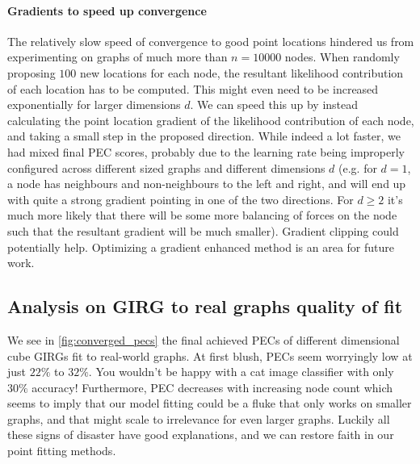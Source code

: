 \paragraph{Gradients to speed up convergence}
The relatively slow speed of convergence to good point locations hindered us from experimenting on graphs of much more than $n=10000$ nodes. When randomly proposing $100$ new locations for each node, the resultant likelihood contribution of each location has to be computed. This might even need to be increased exponentially for larger dimensions $d$. We can speed this up by instead calculating the point location gradient of the likelihood contribution of each node, and taking a small step in the proposed direction. While indeed a lot faster, we had mixed final PEC scores, probably due to the learning rate being improperly configured across different sized graphs and different dimensions $d$ (e.g. for $d=1$, a node has neighbours and non-neighbours to the left and right, and will end up with quite a strong gradient pointing in one of the two directions. For $d \geq 2$ it's much more likely that there will be some more balancing of forces on the node such that the resultant gradient will be much smaller). Gradient clipping could potentially help. Optimizing a gradient enhanced method is an area for future work.


\subsection{Analysis on GIRG to real graphs quality of fit}
We see in \cref{fig:converged_pecs} the final achieved PECs of different dimensional cube GIRGs fit to real-world graphs. At first blush, PECs seem worryingly low at just $22\%$ to $32\%$. You wouldn't be happy with a cat image classifier with only $30\%$ accuracy!
Furthermore, PEC decreases with increasing node count which seems to imply that our model fitting could be a fluke that only works on smaller graphs, and that might scale to irrelevance for even larger graphs.
Luckily all these signs of disaster have good explanations, and we can restore faith in our point fitting methods.

